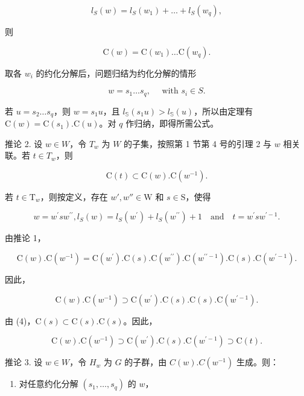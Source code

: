 \[
l _ {S} (w) = l _ {S} \left(w _ {1}\right) + \dots + l _ {S} \left(w _ {q}\right),
\]

则

\[
\mathrm{C} (w) = \mathrm{C} (w _ {1}) \dots \mathrm{C} (w _ {q}).
\]

取各 \(w_{i}\) 的约化分解后，问题归结为约化分解的情形

\[
w = s _ {1} \dots s _ {q}, \quad \text { with } s _ {i} \in S.
\]

若 \(u = s_2 \ldots s_q\)，则 \(w = s_1u\)，且 \(l_{\mathbb{S}}(s_1u) > l_{\mathbb{S}}(u)\)，所以由定理有 \(\mathrm{C}(w) = \mathrm{C}(s_1). \mathrm{C}(u)\)。对 \(q\) 作归纳，即得所需公式。

推论 2. 设 \(w \in W\)，令 \(T_w\) 为 \(W\) 的子集，按照第 1 节第 4 号的引理 2 与 \(w\) 相关联。若 \(t \in T_w\)，则

\[
\mathrm{C} (t) \subset \mathrm{C} (w). \mathrm{C} (w ^ {- 1}).
\]

若 \(t \in \mathrm{T}_w\)，则按定义，存在 \(w', w'' \in \mathrm{W}\) 和 \(s \in \mathrm{S}\)，使得

\[
w = w ^ {\prime} s w ^ {\prime \prime}, l _ {S} (w) = l _ {S} (w ^ {\prime}) + l _ {S} (w ^ {\prime \prime}) + 1 \quad \text {and} \quad t = w ^ {\prime} s w ^ {\prime - 1}.
\]

由推论 1，

\[
\mathrm{C} (w). \mathrm{C} (w ^ {- 1}) = \mathrm{C} (w ^ {\prime}). \mathrm{C} (s). \mathrm{C} (w ^ {\prime \prime}). \mathrm{C} (w ^ {\prime \prime - 1}). \mathrm{C} (s). \mathrm{C} (w ^ {\prime - 1}).
\]

因此，

\[
\mathrm{C} (w). \mathrm{C} (w ^ {- 1}) \supset \mathrm{C} (w ^ {\prime}). \mathrm{C} (s). \mathrm{C} (s). \mathrm{C} (w ^ {\prime - 1}).
\]

由 (4)，\(\mathrm{C}(s) \subset \mathrm{C}(s). \mathrm{C}(s)\)。因此，

\[
\mathrm{C} (w). \mathrm{C} (w ^ {- 1}) \supset \mathrm{C} (w ^ {\prime}). \mathrm{C} (s). \mathrm{C} (w ^ {\prime - 1}) \supset \mathrm{C} (t).
\]

推论 3. 设 \(w \in W\)，令 \(H_w\) 为 \(G\) 的子群，由 \(C(w).C(w^{-1})\) 生成。则：

\begin{enumerate}
\def\labelenumi{\alph{enumi})}
\tightlist
\item
  对任意约化分解 \((s_1,\ldots ,s_q)\) 的 \(w\)，
\end{enumerate}

